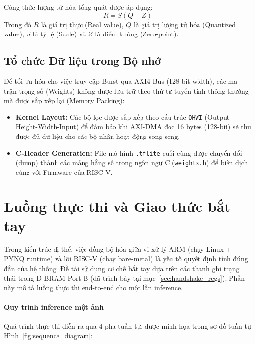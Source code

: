 Công thức lượng tử hóa tổng quát được áp dụng:
\begin{equation}
    R = S(Q - Z)
\end{equation}
Trong đó $R$ là giá trị thực (Real value), $Q$ là giá trị lượng tử hóa (Quantized value), $S$ là tỷ lệ (Scale) và $Z$ là điểm không (Zero-point).

\subsection{Tổ chức Dữ liệu trong Bộ nhớ}
Để tối ưu hóa cho việc truy cập Burst qua AXI4 Bus (128-bit width), các ma trận trọng số (Weights) không được lưu trữ theo thứ tự tuyến tính thông thường mà được sắp xếp lại (Memory Packing):
\begin{itemize}
    \item \textbf{Kernel Layout:} Các bộ lọc được sắp xếp theo cấu trúc \texttt{OHWI} 
    (Output-Height-Width-Input) để đảm bảo khi AXI-DMA đọc 16 bytes (128-bit) sẽ thu được 
    đủ dữ liệu cho các bộ nhân hoạt động song song.
    \item \textbf{C-Header Generation:} File mô hình \texttt{.tflite} cuối cùng được
     chuyển đổi (dump) thành các mảng hằng số trong ngôn ngữ C (\texttt{weights.h})
      để biên dịch cùng với Firmware của RISC-V.
\end{itemize}

\section{Luồng thực thi và Giao thức bắt tay}
\label{sec:system_flow}

Trong kiến trúc dị thể, việc đồng bộ hóa giữa vi xử lý ARM (chạy Linux + PYNQ runtime) và lõi RISC-V (chạy bare-metal) là yếu tố quyết định tính đúng đắn của hệ thống. Đề tài sử dụng cơ chế bắt tay dựa trên các thanh ghi trạng thái trong D-BRAM Port B (đã trình bày tại mục~\ref{sec:handshake_regs}). Phần này mô tả luồng thực thi end-to-end cho một lần inference.

\paragraph{Quy trình inference một ảnh}
Quá trình thực thi diễn ra qua 4 pha tuần tự, được minh họa trong sơ đồ tuần tự Hình~\ref{fig:sequence_diagram}:


